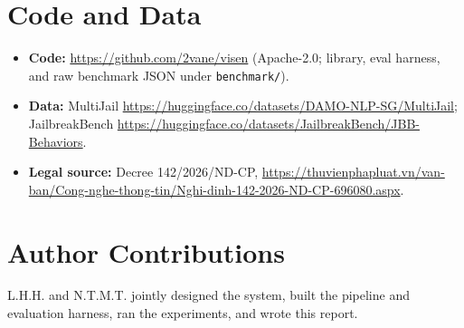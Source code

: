 \documentclass[11pt, a4paper]{article}
\begin{document}
\section*{Code and Data}
\begin{itemize}
    \item \textbf{Code:} \url{https://github.com/2vane/visen} (Apache-2.0; library, eval harness, and raw benchmark JSON under \texttt{benchmark/}).
    \item \textbf{Data:} MultiJail \url{https://huggingface.co/datasets/DAMO-NLP-SG/MultiJail}; JailbreakBench \url{https://huggingface.co/datasets/JailbreakBench/JBB-Behaviors}.
    \item \textbf{Legal source:} Decree 142/2026/ND-CP, \url{https://thuvienphapluat.vn/van-ban/Cong-nghe-thong-tin/Nghi-dinh-142-2026-ND-CP-696080.aspx}.
\end{itemize}

\section*{Author Contributions}
L.H.H. and N.T.M.T. jointly designed the system, built the pipeline and evaluation harness, ran the experiments, and wrote this report.
\end{document}
